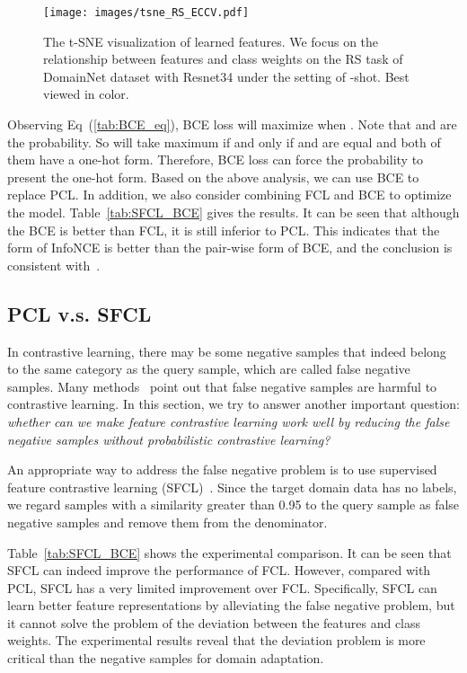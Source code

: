 \begin{figure}
    \centering

        \centering
     \texttt{[image: images/tsne\_RS\_ECCV.pdf]}

     \caption{The t-SNE visualization of learned features. We focus on the relationship between features and class weights on the RS task of DomainNet dataset with Resnet34 under the setting of -shot. Best viewed in color.}
     \label{fig:tsne}

\end{figure}
Observing Eq~(\ref{tab:BCE_eq}), BCE loss will maximize  when . Note that  and  are the probability. So  will take maximum if and only if  and  are equal and both of them have a one-hot form. Therefore, BCE loss can force the probability to present the one-hot form.
Based on the above analysis, we can use BCE to replace PCL. In addition, we also consider combining FCL and BCE to optimize the model.  Table~\ref{tab:SFCL_BCE} gives the results. It can be seen that although the BCE is better than FCL, it is still inferior to PCL. This indicates that the form of InfoNCE is better than the pair-wise form of BCE, and the conclusion is consistent with~\cite{wang2021understanding}.

\subsection{PCL v.s. SFCL}
\label{sec:False Negative}
In contrastive learning, there may be some negative samples that indeed belong to the same category as the query sample, which are called false negative samples.
Many methods~\cite{dwibedi2021little,khosla2020supervised,xu2020hierarchical} point out that false negative samples are harmful to contrastive learning.
In this section, we try to answer another important question: \textit{whether can we make feature contrastive learning work well by reducing the false negative samples without probabilistic contrastive learning? }

An appropriate way to address the false negative problem is to use supervised feature contrastive learning (SFCL)~\cite{khosla2020supervised}. Since the target domain data has no labels, we regard samples with a similarity greater than 0.95 to the query sample as false negative samples and remove them from the denominator. 


Table~\ref{tab:SFCL_BCE} shows the experimental comparison.
It can be seen that SFCL can indeed improve the performance of FCL.
However, compared with PCL, SFCL has a very limited improvement over FCL. Specifically, SFCL can learn better feature representations by alleviating the false negative problem, but it cannot solve the problem of the deviation between the features and class weights. The experimental results reveal that the deviation problem is more critical than the negative samples for domain adaptation. 

